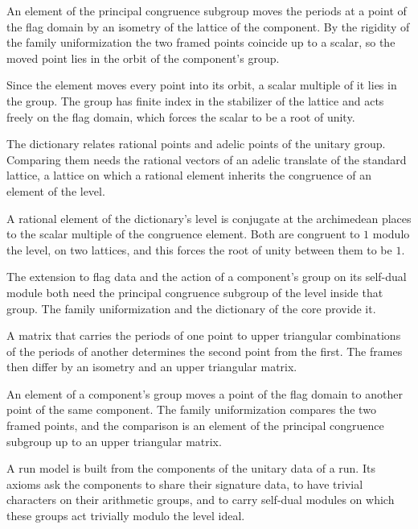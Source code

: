 An element of the principal congruence subgroup moves the periods at a point of the flag domain by an
isometry of the lattice of the component. By the rigidity of the family uniformization the two framed points
coincide up to a scalar, so the moved point lies in the orbit of the component's group.

Since the element moves every point into its orbit, a scalar multiple of it lies in the group. The group
has finite index in the stabilizer of the lattice and acts freely on the flag domain, which forces the
scalar to be a root of unity.

The dictionary relates rational points and adelic points of the unitary group. Comparing them needs the
rational vectors of an adelic translate of the standard lattice, a lattice on which a rational element
inherits the congruence of an element of the level.

A rational element of the dictionary's level is conjugate at the archimedean places to the scalar multiple
of the congruence element. Both are congruent to $1$ modulo the level, on two lattices, and this forces the
root of unity between them to be $1$.

The extension to flag data and the action of a component's group on its self-dual module both need the
principal congruence subgroup of the level inside that group. The family uniformization and the dictionary
of the core provide it.

A matrix that carries the periods of one point to upper triangular combinations of the periods of another
determines the second point from the first. The frames then differ by an isometry and an upper triangular
matrix.

An element of a component's group moves a point of the flag domain to another point of the same component.
The family uniformization compares the two framed points, and the comparison is an element of the principal
congruence subgroup up to an upper triangular matrix.

A run model is built from the components of the unitary data of a run. Its axioms ask the components
to share their signature data, to have trivial characters on their arithmetic groups, and to carry
self-dual modules on which these groups act trivially modulo the level ideal.

